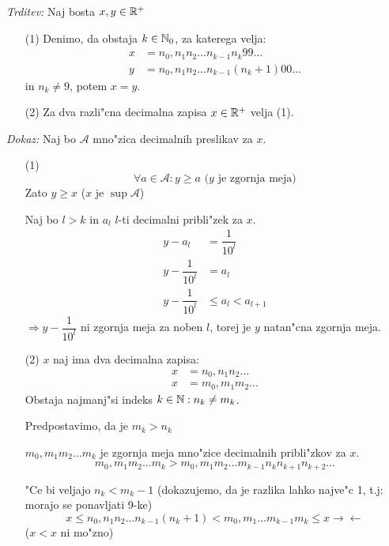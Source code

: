 \emph{Trditev:} Naj bosta $x, y \in \mathbb{R}^+$
\begin{enumerate}
	\item[(1)] Denimo, da obstaja $k \in \mathbb{N}_0$, za katerega velja:
	\begin{align*}
		x &= n_0,n_1n_2\ldots n_{k-1}n_k99\ldots\\
		y &= n_0,n_1n_2\ldots n_{k-1}(n_k + 1)00\ldots
	\end{align*}
	in $n_k \neq 9$, potem $x = y$.
	
	\item[(2)] Za dva razli"cna decimalna zapisa $x \in \mathbb{R}^+$ velja (1).
\end{enumerate}

\emph{Dokaz:} Naj bo $\mathcal{A}$ mno"zica decimalnih preslikav za $x$.
\begin{itemize}
	\item[(1)] 
	\begin{equation*}
	\forall a \in \mathcal{A}: y \geq a \text{ ($y$ je zgornja meja)}
	\end{equation*}
	Zato $y \geq x$ ($x$ je $\sup \mathcal{A}$)
	
	
	Naj bo $l > k$ in $a_l$ $l$-ti decimalni pribli"zek za $x$.
	\begin{align*}
	y - a_l &= \dfrac{1}{10^l}\\
	y - \dfrac{1}{10^l} &= a_l\\
	y - \dfrac{1}{10^l} &\leq a_l < a_{l+1}	
	\end{align*}
	$\Rightarrow y - \dfrac{1}{10^l}$ ni zgornja meja za noben $l$, torej je $y$ natan"cna zgornja meja.
	
	\item[(2)]
	$x$ naj ima dva decimalna zapisa:
	\begin{align*}
		x &= n_0,n_1n_2\ldots\\
		x &= m_0,m_1m_2\ldots
	\end{align*}
	Obstaja najmanj"si indeks $k \in \mathbb{N}: n_k \neq m_k$.
	
	Predpostavimo, da je $m_k > n_k$
	
	$m_0,m_1m_2\ldots m_k$ je zgornja meja mno"zice decimalnih pribli"zkov za $x$.
	\begin{equation*}
		m_0,m_1m_2\ldots m_k > m_0,m_1m_2\ldots m_{k-1}n_kn_{k+1}n_{k+2}\ldots
	\end{equation*}
	
	"Ce bi veljajo $n_k < m_k - 1$ (dokazujemo, da je razlika lahko najve"c 1, t.j: morajo se ponavljati 9-ke)
	\begin{equation*}
		x \leq n_0,n_1n_2\ldots n_{k-1}(n_k+1) < m_0,m_1\ldots m_{k-1}m_k \leq x \rightarrow \leftarrow
	\end{equation*}
	($x < x$ ni mo"zno)
	

\end{itemize}
